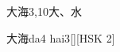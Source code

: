\begin{entry}{大海}{3,10}{⼤、⽔}
  \begin{phonetics}{大海}{da4 hai3}[][HSK 2]
  \end{phonetics}
\end{entry}
